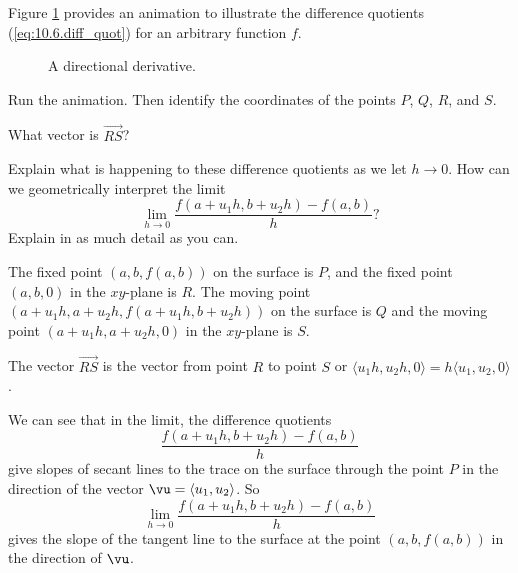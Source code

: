 \begin{activity} \label{A:10.6.1} Figure \ref{F:10.6.DD_animation} provides an animation to illustrate the difference quotients (\ref{eq:10.6.diff_quot}) for an arbitrary function $f$.
\begin{figure}[ht]
\begin{center}
\end{center}
\caption{A directional derivative.}
\label{F:10.6.DD_animation}
\end{figure}

    \ba
    \item Run the animation. Then identify the coordinates of the points $P$, $Q$, $R$, and $S$.


 
    \item What vector is $\overrightarrow{RS}$?



    \item Explain what is happening to these difference quotients as we let $h \to 0$. How can we geometrically interpret the limit
    \[\lim_{h \to 0} \frac{f(a+u_1h, b+u_2h) - f(a,b)}{h}?\]
    Explain in as much detail as you can.


    \ea

\end{activity}
\begin{smallhint}

\end{smallhint}
\begin{bighint}

\end{bighint}
\begin{activitySolution}
\ba 
\item The fixed point $(a,b,f(a,b))$ on the surface is $P$, and the fixed point $(a,b,0)$ in the $xy$-plane is $R$. The moving point $(a+u_1h, a+u_2h, f(a+u_1h, b+u_2h))$ on the surface is $Q$ and the moving point $(a+u_1h, a+u_2h, 0)$ in the $xy$-plane is $S$. 

\item The vector  $\overrightarrow{RS}$ is the vector from point $R$ to point $S$ or $\langle u_1h, u_2h, 0 \rangle = h \langle u_1, u_2, 0 \rangle$. 

\item We can see that in the limit, the difference quotients 
\[ \frac{f(a+u_1h, b+u_2h) - f(a,b)}{h}\] 
give slopes of secant lines to the trace on the surface through the point $P$ in the direction of the vector $\vu = \langle u_1, u_2 \rangle$. So 
\[\lim_{h \to 0} \frac{f(a+u_1h, b+u_2h) - f(a,b)}{h}\]
gives the slope of the tangent line to the surface at the point $(a, b, f(a, b))$ in the direction of $\vu$. 

\ea

\end{activitySolution}
\aftera
